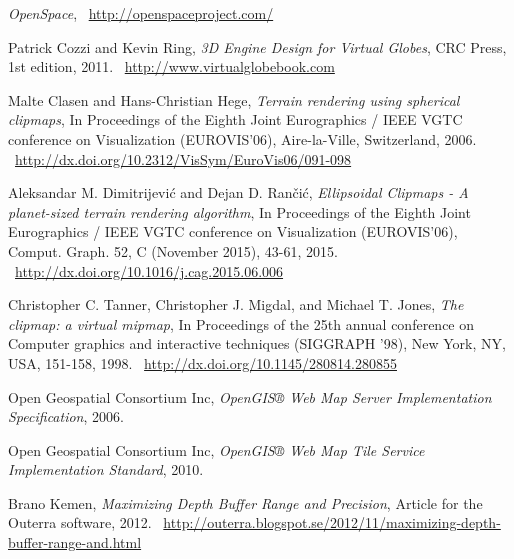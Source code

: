 \cleardoublepage
{}
{}
\begin{thebibliography}{99}



  \emph{OpenSpace},
   \
  \url{http://openspaceproject.com/}

  Patrick Cozzi and Kevin Ring,
  \emph{3D Engine Design for Virtual Globes},
  CRC Press,
  1st edition,
  2011. \
  \url{http://www.virtualglobebook.com}

  Malte Clasen and Hans-Christian Hege,
  \emph{Terrain rendering using spherical clipmaps},
  In Proceedings of the Eighth Joint Eurographics / IEEE VGTC conference on Visualization (EUROVIS'06),
  Aire-la-Ville, Switzerland,
  2006. \
  \url{http://dx.doi.org/10.2312/VisSym/EuroVis06/091-098}

  Aleksandar M. Dimitrijević and Dejan D. Rančić,
  \emph{Ellipsoidal Clipmaps - A planet-sized terrain rendering algorithm},
  In Proceedings of the Eighth Joint Eurographics / IEEE VGTC conference on Visualization (EUROVIS'06),
  Comput. Graph. 52, C (November 2015), 43-61,
  2015. \
  \url{http://dx.doi.org/10.1016/j.cag.2015.06.006}

\bibitem{tanner98}
  Christopher C. Tanner, Christopher J. Migdal, and Michael T. Jones,
  \emph{The clipmap: a virtual mipmap},
  In Proceedings of the 25th annual conference on Computer graphics and interactive techniques (SIGGRAPH '98),
  New York, NY, USA, 151-158,
  1998. \
  \url{http://dx.doi.org/10.1145/280814.280855}

\bibitem{wms06}
  Open Geospatial Consortium Inc,
  \emph{OpenGIS® Web Map Server Implementation Specification},
  2006.

\bibitem{wmts10}
  Open Geospatial Consortium Inc,
  \emph{OpenGIS® Web Map Tile Service Implementation Standard},
  2010.

\bibitem{kemen12}
  Brano Kemen,
  \emph{Maximizing Depth Buffer Range and Precision},
  Article for the Outerra software,
  2012. \
  \url{http://outerra.blogspot.se/2012/11/maximizing-depth-buffer-range-and.html}


\end{thebibliography}
